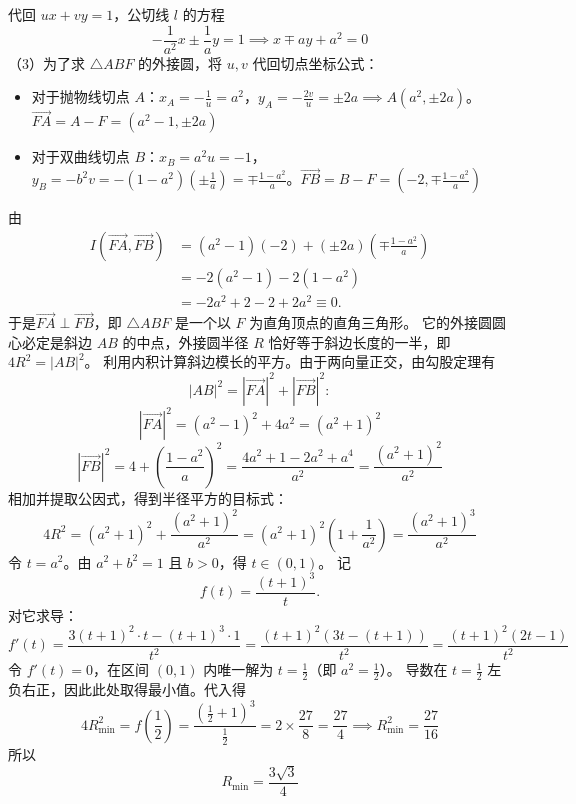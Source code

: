\begin{solution}
代回 $ux + vy = 1$，公切线 $l$ 的方程
$$ -\frac{1}{a^2}x \pm \frac{1}{a}y = 1 \implies x \mp ay + a^2 = 0 $$
（3）为了求 $\triangle ABF$ 的外接圆，将 $u, v$ 代回切点坐标公式：
\begin{itemize}
\item 对于抛物线切点 $A$：$x_A = -\frac{1}{u} = a^2$，$y_A = -\frac{2v}{u} = \pm 2a \implies A(a^2, \pm 2a)$。$ \overrightarrow{FA} = A - F = (a^2-1, \pm 2a) $
\item 对于双曲线切点 $B$：$x_B = a^2 u = -1$，$y_B = -b^2 v = -(1-a^2)(\pm \frac{1}{a}) = \mp \frac{1-a^2}{a}$。$ \overrightarrow{FB} = B - F = \left(-2, \mp \frac{1-a^2}{a}\right) $
\end{itemize}
由
\begin{align*}
I(\overrightarrow{FA}, \overrightarrow{FB}) &= (a^2-1)(-2) + (\pm 2a)\left(\mp \frac{1-a^2}{a}\right) \\
&= -2(a^2-1) - 2(1-a^2) \\
&= -2a^2 + 2 - 2 + 2a^2 \equiv 0.
\end{align*}
于是$\overrightarrow{FA} \perp \overrightarrow{FB}$，即 $\triangle ABF$ 是一个以 $F$ 为直角顶点的直角三角形。
它的外接圆圆心必定是斜边 $AB$ 的中点，外接圆半径 $R$ 恰好等于斜边长度的一半，即 $4R^2 = |AB|^2$。
利用内积计算斜边模长的平方。由于两向量正交，由勾股定理有
$$|AB|^2 = |\overrightarrow{FA}|^2 + |\overrightarrow{FB}|^2:$$
$$ |\overrightarrow{FA}|^2 = (a^2-1)^2 + 4a^2 = (a^2+1)^2 $$
$$ |\overrightarrow{FB}|^2 = 4 + \left(\frac{1-a^2}{a}\right)^2 = \frac{4a^2 + 1 - 2a^2 + a^4}{a^2} = \frac{(a^2+1)^2}{a^2} $$
相加并提取公因式，得到半径平方的目标式：
$$ 4R^2 = (a^2+1)^2 + \frac{(a^2+1)^2}{a^2} = (a^2+1)^2 \left( 1 + \frac{1}{a^2} \right) = \frac{(a^2+1)^3}{a^2} $$
令 $t = a^2$。由 $a^2 + b^2 = 1$ 且 $b>0$，得 $t \in (0, 1)$。
记
$$f(t) = \frac{(t+1)^3}{t}.$$
对它求导：
$$ f'(t) = \frac{3(t+1)^2 \cdot t - (t+1)^3 \cdot 1}{t^2} = \frac{(t+1)^2 (3t - (t+1))}{t^2} = \frac{(t+1)^2 (2t - 1)}{t^2} $$
令 $f'(t) = 0$，在区间 $(0,1)$ 内唯一解为 $t = \frac{1}{2}$（即 $a^2 = \frac{1}{2}$）。
导数在 $t = \frac12$ 左负右正，因此此处取得最小值。代入得
$$ 4R_{\min}^2 = f\left(\frac{1}{2}\right) = \frac{(\frac{1}{2} + 1)^3}{\frac{1}{2}} = 2 \times \frac{27}{8} = \frac{27}{4} \implies R_{\min}^2 = \frac{27}{16} $$
所以
$$ R_{\min} = \frac{3\sqrt{3}}{4} $$
\end{solution}

